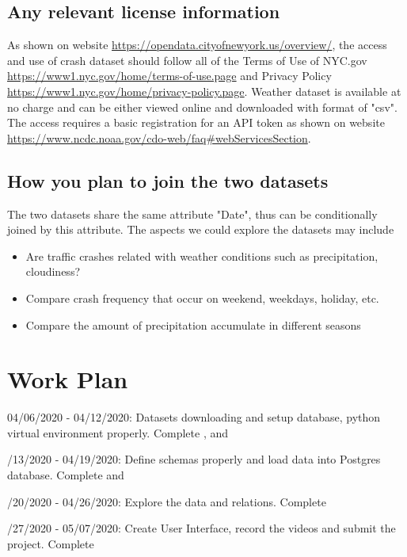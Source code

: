 \documentclass{article}
\begin{document}
\subsection{ Any relevant license information}
As shown on website \url{https://opendata.cityofnewyork.us/overview/}, the access and use of crash dataset should follow all of the Terms of Use of NYC.gov \url{https://www1.nyc.gov/home/terms-of-use.page} and Privacy Policy \url{https://www1.nyc.gov/home/privacy-policy.page}. 
\noindent Weather dataset is available at no charge and can be either viewed online and downloaded with format of "csv". The access requires a basic registration for an API token as shown on website \url{https://www.ncdc.noaa.gov/cdo-web/faq#webServicesSection}.

\subsection{ How you plan to join the two datasets }
The two datasets share the same attribute "Date", thus can be conditionally joined by this attribute. The aspects we could explore the datasets may include
\begin{itemize}
	\item Are traffic crashes related with weather conditions such as precipitation, cloudiness?
	\item Compare crash frequency that occur on weekend, weekdays, holiday, etc.
	\item Compare the amount of precipitation accumulate in different seasons 
\end{itemize}

\section{Work Plan}
04/06/2020 - 04/12/2020: Datasets downloading and setup database, python virtual environment properly. Complete ,  and 

/13/2020 - 04/19/2020: Define schemas properly and load data into Postgres database. Complete  and 

/20/2020 - 04/26/2020: Explore the data and relations. Complete 

/27/2020 - 05/07/2020: Create User Interface, record the videos and submit the project. Complete 
\end{document}

